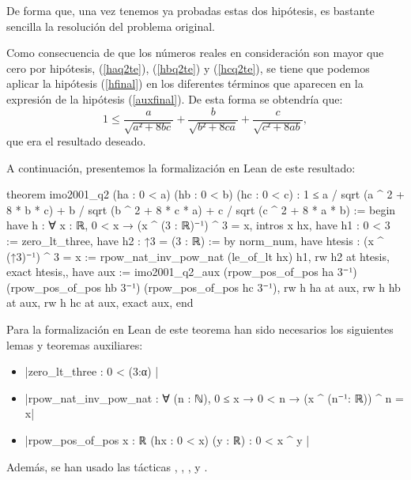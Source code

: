 \begin{demostracion}
  De forma que, una vez tenemos ya probadas estas dos hipótesis, es
  bastante sencilla la resolución del problema original.

  Como consecuencia de que los números reales en consideración son mayor
  que cero por hipótesis, (\ref{haq2te}), (\ref{hbq2te}) y
  (\ref{hcq2te}), se tiene que podemos aplicar la hipótesis
  (\ref{hfinal}) en los diferentes términos que aparecen en la expresión
  de la hipótesis (\ref{auxfinal}).  De esta forma se obtendría que:
  \begin{equation}
    1 ≤ \frac{a}{\sqrt{a²+8bc}}+\frac{b}{\sqrt{b²+8ca}}+
        \frac{c}{\sqrt{c²+8ab}},
  \end{equation}
  que era el resultado deseado.
\end{demostracion}

A continuación, presentemos la formalización en Lean de este resultado:

\begin{leancode}
theorem imo2001_q2
  (ha : 0 < a)
  (hb : 0 < b)
  (hc : 0 < c)
  : 1 ≤ a / sqrt (a ^ 2 + 8 * b * c) +
        b / sqrt (b ^ 2 + 8 * c * a) +
        c / sqrt (c ^ 2 + 8 * a * b) :=
begin
  have h : ∀ {x : ℝ}, 0 < x → (x ^ (3 : ℝ)⁻¹) ^ 3 = x,
    { intros x hx,
      have h1 : 0 < 3 :=
        zero_lt_three,
      have h2 : ↑3 = (3 : ℝ) :=
        by norm_num,
      have htesis : (x ^ (↑3)⁻¹) ^ 3 = x :=
        rpow_nat_inv_pow_nat (le_of_lt hx) h1,
      rw h2 at htesis,
      exact htesis,},
  have aux :=
    imo2001_q2_aux (rpow_pos_of_pos ha 3⁻¹)
                   (rpow_pos_of_pos hb 3⁻¹)
                   (rpow_pos_of_pos hc 3⁻¹),
  rw h ha at aux,
  rw h hb at aux,
  rw h hc at aux,
  exact aux,
end
\end{leancode}

Para la formalización en Lean de este teorema han sido necesarios los
siguientes lemas y teoremas auxiliares:
\begin{itemize}
\item {}|zero_lt_three : 0 < (3:α) |
\item {}|rpow_nat_inv_pow_nat : ∀ (n : ℕ), 0 ≤ x → 0 < n →
(x ^ (n⁻¹: ℝ)) ^ n = x|
\item {}|rpow_pos_of_pos {x : ℝ} (hx : 0 < x) (y : ℝ) : 0 < x ^ y |
\end{itemize}

Además, se han usado las tácticas
,
,
,
 y
.
